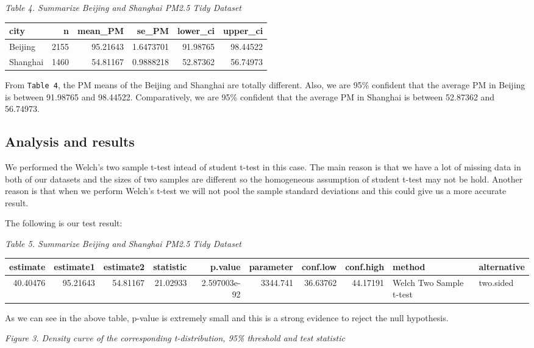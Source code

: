 \documentclass[]{article}
\begin{document}
\emph{Table 4. Summarize Beijing and Shanghai PM2.5 Tidy Dataset}

\begin{longtable}[]{@{}lrrrrr@{}}
\toprule
city & n & mean\_PM & se\_PM & lower\_ci & upper\_ci\tabularnewline
\midrule
\endhead
Beijing & 2155 & 95.21643 & 1.6473701 & 91.98765 &
98.44522\tabularnewline
Shanghai & 1460 & 54.81167 & 0.9888218 & 52.87362 &
56.74973\tabularnewline
\bottomrule
\end{longtable}

From \texttt{Table\ 4}, the PM means of the Beijing and Shanghai are
totally different. Also, we are 95\% confident that the average PM in
Beijing is between 91.98765 and 98.44522. Comparatively, we are 95\%
confident that the average PM in Shanghai is between 52.87362 and
56.74973.

\subsection{Analysis and results}\label{analysis-and-results}

We performed the Welch's two sample t-test intead of student t-test in
this case. The main reason is that we have a lot of missing data in both
of our datasets and the sizes of two samples are different so the
homogeneous assumption of student t-test may not be hold. Another reason
is that when we perform Welch's t-test we will not pool the sample
standard deviations and this could give us a more accurate result.

The following is our test result:

\emph{Table 5. Summarize Beijing and Shanghai PM2.5 Tidy Dataset}

\begin{longtable}[]{@{}rrrrrrrrll@{}}
\toprule
estimate & estimate1 & estimate2 & statistic & p.value & parameter &
conf.low & conf.high & method & alternative\tabularnewline
\midrule
\endhead
40.40476 & 95.21643 & 54.81167 & 21.02933 & 2.597003e-92 & 3344.741 &
36.63762 & 44.17191 & Welch Two Sample t-test & two.sided\tabularnewline
\bottomrule
\end{longtable}

As we can see in the above table, p-value is extremely small and this is
a strong evidence to reject the null hypothesis.

\emph{Figure 3. Density curve of the corresponding t-distribution, 95\%
threshold and test statistic}
\end{document}
